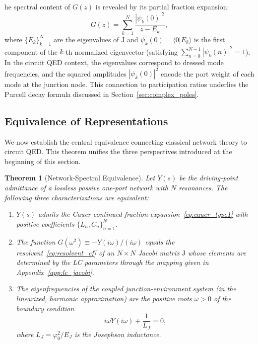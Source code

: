 \documentclass[reprint, floatfix, superscriptaddress, amsmath, amssymb, longbibliography]{revtex4-2}
\newtheorem{theorem}{Theorem}[section]
\begin{document}
he spectral content of $G(z)$ is revealed by its partial fraction expansion:
\begin{equation}
G(z) = \sum_{k=1}^{N} \frac{|\psi_k(0)|^2}{z - E_k},
\label{eq:resolvent_spectral}
\end{equation}
where $\{E_k\}_{k=1}^{N}$ are the eigenvalues of $\mathrm{J}$ and $\psi_k(0) = \langle 0 | E_k \rangle$ is the first component of the $k$-th normalized eigenvector (satisfying $\sum_{n=0}^{N-1} |\psi_k(n)|^2 = 1$). In the circuit QED context, the eigenvalues correspond to dressed mode frequencies, and the squared amplitudes $|\psi_k(0)|^2$ encode the port weight of each mode at the junction node. This connection to participation ratios underlies the Purcell decay formula discussed in Section~\ref{sec:complex_poles}.

\subsection{Equivalence of Representations}
\label{sec:cf_equivalence}

We now establish the central equivalence connecting classical network theory to circuit QED. This theorem unifies the three perspectives introduced at the beginning of this section.

\begin{theorem}[Network-Spectral Equivalence]
\label{thm:network_spectral}
Let $Y(s)$ be the driving-point admittance of a lossless passive one-port network with $N$ resonances. The following three characterizations are equivalent:
\begin{enumerate}
    \item[(i)] $Y(s)$ admits the Cauer continued fraction expansion~\eqref{eq:cauer_type1} with positive coefficients $\{L_n, C_n\}_{n=1}^{N}$.
    \item[(ii)] The function $G(\omega^2) \equiv -Y(i\omega)/(i\omega)$ equals the resolvent~\eqref{eq:resolvent_cf} of an $N \times N$ Jacobi matrix $\mathrm{J}$ whose elements are determined by the LC parameters through the mapping given in Appendix~\ref{app:lc_jacobi}.
    \item[(iii)] The eigenfrequencies of the coupled junction-environment system (in the linearized, harmonic approximation) are the positive roots $\omega > 0$ of the boundary condition
    \begin{equation}
    i\omega Y(i\omega) + \frac{1}{L_J} = 0,
    \label{eq:boundary_condition_thm}
    \end{equation}
    where $L_J = \varphi_0^2/E_J$ is the Josephson inductance.
\end{enumerate}
\end{theorem}
\end{document}
